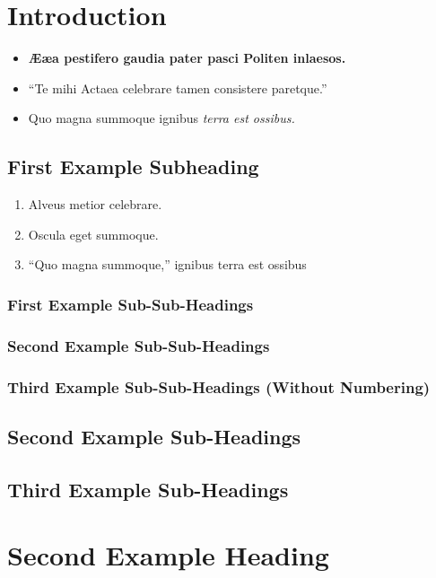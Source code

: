 \section{Introduction}

\lipsum[1][1-4]

\lipsum[2][1-4]


\begin{itemize}
    \item \textbf{Ææa pestifero gaudia pater pasci Politen inlaesos.}
    \item \enquote{Te mihi Actaea celebrare tamen consistere paretque.}
    \item Quo magna summoque ignibus \emph{terra est ossibus.}
\end{itemize}

\subsection{First Example Subheading}

\lipsum[3][1-3]

\blockquote{%
    \lipsum[1]
}

\lipsum[4][1-6]

\begin{enumerate}
    \item Alveus metior celebrare.
    \item Oscula eget summoque.
    \item \enquote{Quo magna summoque,} ignibus terra est ossibus
\end{enumerate}

\subsubsection{First Example Sub-Sub-Headings}

\lipsum[5][1-4]

\subsubsection{Second Example Sub-Sub-Headings}

\lipsum[6][1-6]

\subsubsection*{Third Example Sub-Sub-Headings (Without Numbering)}

\lipsum[7][1-6]

\subsection{Second Example Sub-Headings}

\lipsum[8][1-6]

\subsection{Third Example Sub-Headings}

\lipsum[9][1-6]

\section{Second Example Heading}

\lipsum[10]
